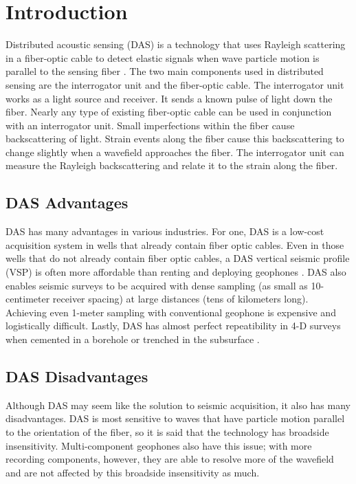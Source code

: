 \section{Introduction}
Distributed acoustic sensing (DAS) is a technology that uses Rayleigh scattering in a fiber-optic cable to detect elastic signals when wave particle motion is parallel to the sensing fiber \citep{hornman2013field}. The two main components used in distributed sensing are the interrogator unit and the fiber-optic cable. The interrogator unit works as a light source and receiver. It sends a known pulse of light down the fiber. Nearly any type of existing fiber-optic cable can be used in conjunction with an interrogator unit. Small imperfections within the fiber cause backscattering of light. Strain events along the fiber cause this backscattering to change slightly when a wavefield approaches the fiber. The interrogator unit can measure the Rayleigh backscattering and relate it to the strain along the fiber.

\subsection{DAS Advantages}
DAS has many advantages in various industries. For one, DAS is a low-cost acquisition system in wells that already contain fiber optic cables. Even in those wells that do not already contain fiber optic cables, a DAS vertical seismic profile (VSP) is often more affordable than renting and deploying geophones \citep{mateeva2014distributed}. DAS also enables seismic surveys to be acquired with dense sampling (as small as 10-centimeter receiver spacing) at large distances (tens of kilometers long). Achieving even 1-meter sampling with conventional geophone is expensive and logistically difficult. Lastly, DAS has almost perfect repeatibility in 4-D surveys when cemented in a borehole or trenched in the subsurface \citep{mateeva2013distributed}.

\subsection{DAS Disadvantages}
Although DAS may seem like the solution to seismic acquisition, it also has many disadvantages. DAS is most sensitive to waves that have particle motion parallel to the orientation of the fiber, so it is said that the technology has broadside insensitivity.  Multi-component geophones also have this issue; with more recording components, however, they are able to resolve more of the wavefield and are not affected by this broadside insensitivity as much.

